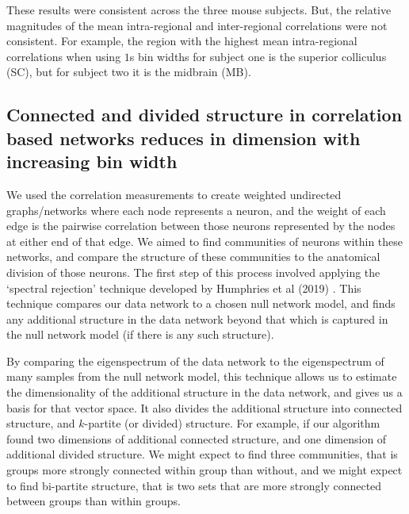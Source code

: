   These results were consistent across the three mouse subjects. But, the relative magnitudes of the mean intra-regional and inter-regional correlations were not consistent. For example, the region with the highest mean intra-regional correlations when using $1$s bin widths for subject one is the superior colliculus (SC), but for subject two it is the midbrain (MB).

  \subsection{Connected and divided structure in correlation based networks reduces in dimension with increasing bin width}\label{sec:dims_result}
  We used the correlation measurements to create weighted undirected graphs/networks where each node represents a neuron, and the weight of each edge is the pairwise correlation between those neurons represented by the nodes at either end of that edge. We aimed to find communities of neurons within these networks, and compare the structure of these communities to the anatomical division of those neurons. The first step of this process involved applying the `spectral rejection' technique developed by Humphries et al (2019) \parencite{humphries}. This technique compares our data network to a chosen null network model, and finds any additional structure in the data network beyond that which is captured in the null network model (if there is any such structure).

  By comparing the eigenspectrum of the data network to the eigenspectrum of many samples from the null network model, this technique allows us to estimate the dimensionality of the additional structure in the data network, and gives us a basis for that vector space. It also divides the additional structure into connected structure, and $k$-partite (or divided) structure. For example, if our algorithm found two dimensions of additional connected structure, and one dimension of additional divided structure. We might expect to find three communities, that is groups more strongly connected within group than without, and we might expect to find bi-partite structure, that is two sets that are more strongly connected between groups than within groups.


